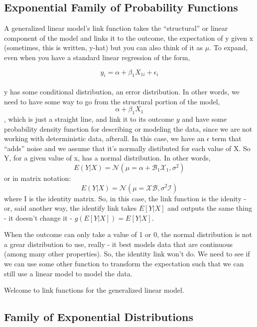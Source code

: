 \documentclass[
]{article}
\begin{document}
\hypertarget{exponential-family-of-probability-functions}{%
\subsection{Exponential Family of Probability
Functions}\label{exponential-family-of-probability-functions}}

A generalized linear model's link function takes the ``structural'' or
linear component of the model and links it to the outcome, the
expectation of y given x (sometimes, this is written, y-hat) but you can
also think of it as \(\mu\). To expand, even when you have a standard
linear regression of the form,

\[y_i = \alpha + \beta_1X_{1i }+ \epsilon_i\]\\
y has some conditional distribution, an error distribution. In other
words, we need to have some way to go from the structural portion of the
model, \[\alpha + \beta_1X_1\], which is just a straight line, and link
it to its outcome \(y\) and have some probability density function for
describing or modeling the data, since we are not working with
deterministic data, afterall. In this case, we have an \(\epsilon\) term
that ``adds'' noise and we assume that it's normally distibuted for each
value of X. So Y, for a given value of x, has a normal distribution. In
other words, \[E(Y|X) = \mathcal{N(\mu=\alpha + B_1X_1, \sigma^2)}\] or
in matrix notation:\\
\[E(Y|X) = \mathcal{N(\mu=XB, \sigma^2I)}\] where I is the identity
matrix. So, in this case, the link function is the idenity - or, said
another way, the identify link takes \(E[Y|X]\) and outputs the same
thing - it doesn't change it - \(g(E[Y|X]) = E[Y|X]\).

When the outcome can only take a value of 1 or 0, the normal
distribution is not a grear distribution to use, really - it best models
data that are continuous (among many other properties). So, the identity
link won't do. We need to see if we can use some other function to
transform the expectation such that we can still use a linear model to
model the data.

Welcome to link functions for the generalized linear model.

\hypertarget{family-of-exponential-distributions}{%
\subsection{Family of Exponential
Distributions}\label{family-of-exponential-distributions}}
\end{document}
